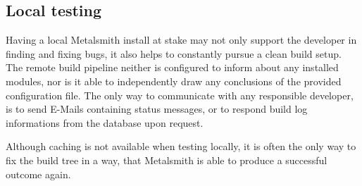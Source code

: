 \subsection{Local testing}
Having a local Metalsmith install at stake may not only support the developer in finding and fixing bugs, it also helps to constantly pursue a clean build setup. The remote build pipeline neither is configured to inform about any installed modules, nor is it able to independently draw any conclusions of the provided configuration file. The only way to communicate with any responsible developer, is to send E-Mails containing status messages, or to respond build log informations from the database upon request.

Although caching is not available when testing locally, it is often the only way to fix the build tree in a way, that Metalsmith is able to produce a successful outcome again.
